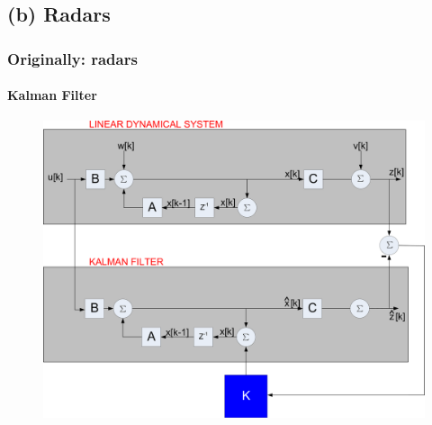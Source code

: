 \subsection{(b) Radars}
\begin{frame}
\frametitle{Originally: radars}
\framesubtitle{Kalman Filter}
\logoCSIPCPL\mypagenum
\begin{figure}
\includegraphics[width=1.0\textwidth]{thesis/TRK_KalmanFilter_blockDiagram.pdf}
\end{figure}
\end{frame}



